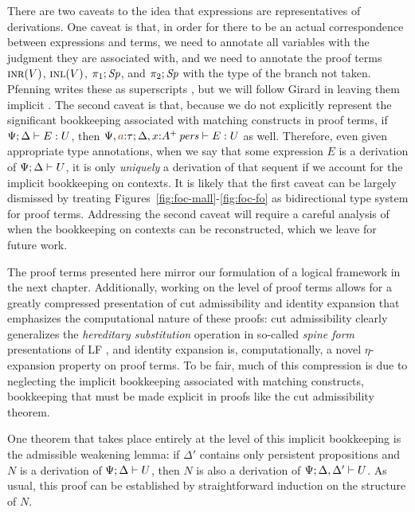 There are two caveats to the idea that expressions are representatives
of derivations. One caveat is that, in order for there to be an actual
correspondence between expressions and terms, we need to annotate all
variables with the judgment they are associated with, and we need to
annotate the proof terms 
$\textsc{inr}({V})$, $\textsc{inl}({V})$, $\pi_1;{{\it Sp}}$, and $\pi_2;{{\it Sp}}$ 
with the type of the branch not taken. Pfenning writes these as
superscripts \cite{pfenning08church}, but we will follow Girard
in leaving them implicit \cite{girard89proofs}. The second caveat is
that, because we do not explicitly represent the significant
bookkeeping associated with matching constructs in proof terms, if
${\Psi}; {\Delta} \vdash {E} : {U}$, then $\foct{\Psi, \lf{a}{:}\tau}{\Delta,
  x{:}\ispers{A^+}}{E}{U}$ as well. Therefore, even given appropriate
type annotations, when we say that some expression $E$ is a derivation
of ${\Psi};{\Delta} \vdash {U} \mathstrut$, it is only {\it uniquely} a derivation of
that sequent if we account for the implicit bookkeeping on contexts.
It is likely that the first caveat can be largely dismissed by
treating Figures~\ref{fig:foc-mall}-\ref{fig:foc-fo} as bidirectional
type system for proof terms. Addressing the second caveat will
require a careful analysis of when the bookkeeping on contexts
can be reconstructed, which we leave for future work. 

The proof terms presented here mirror our formulation of a
logical framework in the next chapter.  Additionally, working on the
level of proof terms allows for a greatly compressed presentation of
cut admissibility and identity expansion that emphasizes the
computational nature of these proofs: cut admissibility clearly
generalizes the {\it hereditary substitution} operation in so-called {\it
  spine form} presentations of LF \cite{cervesato02linear}, and
identity expansion is, computationally, a novel $\eta$-expansion
property on proof terms.  To be fair, much
of this compression is due to neglecting the implicit bookkeeping
associated with matching constructs, bookkeeping that must be made
explicit in proofs like the cut admissibility theorem.

One theorem that takes place entirely at the level of this implicit
bookkeeping is the admissible weakening lemma: if $\Delta'$ contains
only persistent propositions and $N$ is a derivation of
${\Psi};{\Delta} \vdash {U} \mathstrut$, then $N$ is also a derivation of
${\Psi};{\Delta, \Delta'} \vdash {U} \mathstrut$. As usual, this proof can be
established by straightforward induction on the structure of $N$.

